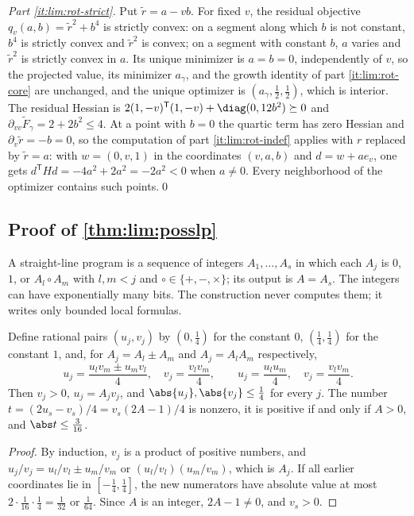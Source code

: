 \emph{Part \ref{it:lim:rot-strict}.} Put $\tilde r=a-vb$. For fixed $v$,
the residual objective $q_v(a,b)=\tilde r^2+b^4$ is strictly convex: on a
segment along which $b$ is not constant, $b^4$ is strictly convex and
$\tilde r^2$ is convex; on a segment with constant $b$, $a$ varies and
$\tilde r^2$ is strictly convex in $a$. Its unique minimizer is $a=b=0$,
independently of $v$, so the projected value, its minimizer $a_\gamma$, and
the growth identity of part \ref{it:lim:rot-core} are unchanged, and the
unique optimizer is $(a_\gamma,\frac12,\frac12)$, which is interior. The
residual Hessian is $2(1,-v)^{\mathsf T}(1,-v)+\diag(0,12b^2)\succeq0$ and
$\partial_{vv}\widetilde F_\gamma=2+2b^2\le4$. At a point with $b=0$ the
quartic term has zero Hessian and $\partial_v\tilde r=-b=0$, so the
computation of part \ref{it:lim:rot-indef} applies with $r$ replaced by
$\tilde r=a$: with $w=(0,v,1)$ in the coordinates $(v,a,b)$ and $d=w+ae_v$,
one gets $d^{\mathsf T}Hd=-4a^2+2a^2=-2a^2<0$ when $a\ne0$. Every
neighborhood of the optimizer contains such points.\qed

\subsection{Proof of \texorpdfstring{\cref{thm:lim:posslp}}{the PosSLP theorem}}\label{app:lim:posslp}

A straight-line program is a sequence of integers $A_1,\ldots,A_s$ in which
each $A_j$ is $0$, $1$, or $A_l\circ A_m$ with $l,m<j$ and
$\circ\in\{+,-,\times\}$; its output is $A=A_s$. The integers can have
exponentially many bits. The construction never computes them; it writes
only bounded local formulas.

\begin{lemma}\label{lem:lim:pairs}
Define rational pairs $(u_j,v_j)$ by $(0,\frac14)$ for the constant $0$,
$(\frac14,\frac14)$ for the constant $1$, and, for $A_j=A_l\pm A_m$ and
$A_j=A_lA_m$ respectively,
\[
 u_j=\frac{u_lv_m\pm u_mv_l}4,\quad v_j=\frac{v_lv_m}4,\qquad
 u_j=\frac{u_lu_m}4,\quad v_j=\frac{v_lv_m}4 .
\]
Then $v_j>0$, $u_j=A_jv_j$, and $\abs{u_j},\abs{v_j}\le\frac14$ for every $j$.
The number $t=(2u_s-v_s)/4=v_s(2A-1)/4$ is nonzero, it is positive if and
only if $A>0$, and $\abs t\le\frac3{16}$.
\end{lemma}

\begin{proof}
By induction, $v_j$ is a product of positive numbers, and
$u_j/v_j=u_l/v_l\pm u_m/v_m$ or $(u_l/v_l)(u_m/v_m)$, which is $A_j$. If all
earlier coordinates lie in $[-\frac14,\frac14]$, the new numerators have
absolute value at most $2\cdot\frac1{16}\cdot\frac14=\frac1{32}$ or
$\frac1{64}$. Since $A$ is an integer, $2A-1\ne0$, and $v_s>0$.
\end{proof}

